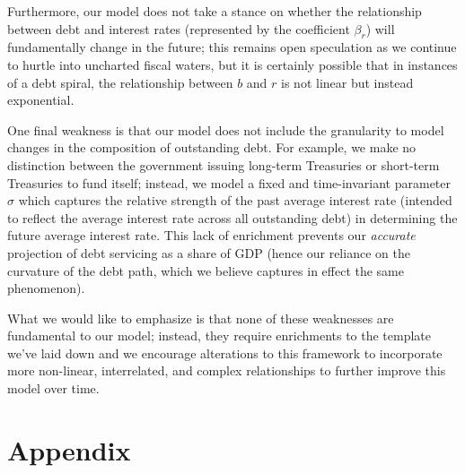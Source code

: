 \documentclass[12pt]{article}
\begin{document}
Furthermore, our model does not take a stance on whether the relationship between debt and interest rates (represented by the coefficient $\beta_r$) will fundamentally change in the future; this remains open speculation as we continue to hurtle into uncharted fiscal waters, but it is certainly possible that in instances of a debt spiral, the relationship between $b$ and $r$ is not linear but instead exponential. 

One final weakness is that our model does not include the granularity to model changes in the composition of outstanding debt. For example, we make no distinction between the government issuing long-term Treasuries or short-term Treasuries to fund itself; instead, we model a fixed and time-invariant parameter $\sigma$ which captures the relative strength of the past average interest rate (intended to reflect the average interest rate across all outstanding debt) in determining the future average interest rate. This lack of enrichment prevents our \textit{accurate} projection of debt servicing as a share of GDP (hence our reliance on the curvature of the debt path, which we believe captures in effect the same phenomenon).

What we would like to emphasize is that none of these weaknesses are fundamental to our model; instead, they require enrichments to the template we've laid down and we encourage alterations to this framework to incorporate more non-linear, interrelated, and complex relationships to further improve this model over time.

\section{Appendix}
\end{document}
